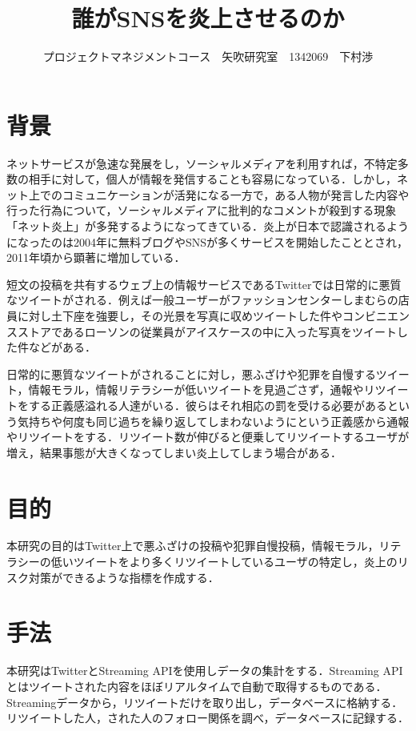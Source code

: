 \documentclass[uplatex,twocolumn,dvipdfmx]{jsarticle}
\title{\vspace{-5mm}\fontsize{14pt}{0pt}\selectfont  誰がSNSを炎上させるのか}
\author{\normalsize プロジェクトマネジメントコース　矢吹研究室　1342069　下村渉}
\date{}
\begin{document}
\fontsize{10.5pt}{\baselineskip}\selectfont
\maketitle





\section{背景}

ネットサービスが急速な発展をし，ソーシャルメディアを利用すれば，不特定多数の相手に対して，個人が情報を発信することも容易になっている．しかし，ネット上でのコミュニケーションが活発になる一方で，ある人物が発言した内容や行った行為について，ソーシャルメディアに批判的なコメントが殺到する現象「ネット炎上」が多発するようになってきている\cite{a}．炎上が日本で認識されるようになったのは2004年に無料ブログやSNSが多くサービスを開始したこととされ，2011年頃から顕著に増加している\cite{b}．

 短文の投稿を共有するウェブ上の情報サービスであるTwitterでは日常的に悪質なツイートがされる．例えば一般ユーザーがファッションセンターしまむらの店員に対し土下座を強要し，その光景を写真に収めツイートした件やコンビニエンスストアであるローソンの従業員がアイスケースの中に入った写真をツイートした件などがある．

日常的に悪質なツイートがされることに対し，悪ふざけや犯罪を自慢するツイート，情報モラル，情報リテラシーが低いツイートを見過ごさず，通報やリツイートをする正義感溢れる人達がいる．彼らはそれ相応の罰を受ける必要があるという気持ちや何度も同じ過ちを繰り返してしまわないようにという正義感から通報やリツイートをする．リツイート数が伸びると便乗してリツイートするユーザが増え，結果事態が大きくなってしまい炎上してしまう場合がある．
 

\noindent







\section{目的}
本研究の目的はTwitter上で悪ふざけの投稿や犯罪自慢投稿，情報モラル，リテラシーの低いツイートをより多くリツイートしているユーザの特定し，炎上のリスク対策ができるような指標を作成する．


\section{手法}
本研究はTwitterとStreaming APIを使用しデータの集計をする．Streaming APIとはツイートされた内容をほぼリアルタイムで自動で取得するものである．Streamingデータから，リツイートだけを取り出し，データベースに格納する．リツイートした人，された人のフォロー関係を調べ，データベースに記録する．
\end{document}
